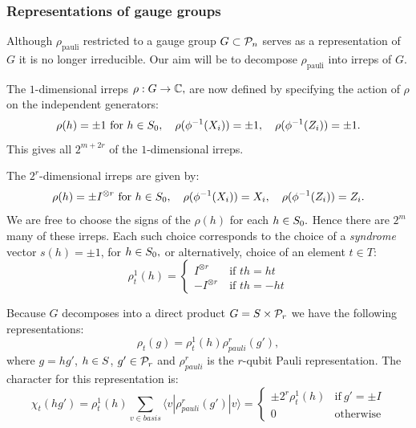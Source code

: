 \documentclass[12pt]{article}
\begin{document}
\subsubsection{Representations of gauge groups}

Although $\rho_{\mathrm{pauli}}$
restricted to a gauge group $G\subset\mathcal{P}_n$ serves as a representation
of $G$ it is no longer irreducible.
Our aim will be to decompose $\rho_{\mathrm{pauli}}$ into irreps of $G.$

The $1$-dimensional irreps $\rho:G\to \mathbb{C},$
are now defined by
specifying the action of $\rho$ on the independent generators:
$$
    \rho(h)=\pm 1\ \mbox{for}\ h\in S_0,
    \quad \rho(\phi^{-1}(X_i)) = \pm 1,\quad \rho(\phi^{-1}(Z_i)) = \pm 1.
$$
This gives all $2^{m+2r}$ of the $1$-dimensional irreps.

The $2^r$-dimensional irreps are given by:
$$
    \rho(h) = \pm I^{\otimes r}\ \mbox{for}\ h\in S_0,
    \quad \rho(\phi^{-1}(X_i)) = X_i,\quad \rho(\phi^{-1}(Z_i)) = Z_i.
$$
We are free to choose the signs of the $\rho(h)$ for each $h\in S_0.$
Hence there are $2^m$ many of these irreps.
Each such choice corresponds to the choice of a {\it syndrome} vector $s(h)=\pm 1$, for $h \in S_0,$
or alternatively, choice of an element $t\in T:$
$$
    \rho^1_t(h) = \left\{ \begin{array}{ll}
 I^{\otimes r}\ &\mbox{if $th=ht$}\\
 -I^{\otimes r}\ &\mbox{if $th=-ht$}\end{array} \right. %
$$


Because $G$ decomposes 
into a direct product $G=S\times \mathcal{P}_r$ we have the
following representations:
$$
    \rho_t(g) = \rho^1_t(h) \rho^r_{pauli}(g'),
$$
where $g=hg'$, $h\in S$, $g'\in \mathcal{P}_r$ 
and $\rho^r_{pauli}$ is the $r$-qubit Pauli representation.
The character for this representation is:
$$
\chi_{t}(hg') = \rho_t^1(h) \sum_{v \in basis} \langle v | \rho^r_{{pauli}}(g') | v \rangle
    = \left\{ \begin{array}{ll}
 \pm 2^r\rho_t^1(h) &\mbox{if}\ g'=\pm I\\
 0 &\mbox{otherwise}\end{array}\right.
$$
\end{document}
